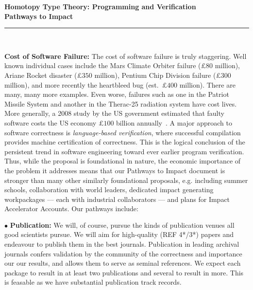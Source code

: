 \documentclass[a4paper,11pt]{article}
\begin{document}
\thispagestyle{plain}

\begin{center}

  {\Large {\bf Homotopy Type Theory: Programming and Verification \\
\vspace{0.2in} 
Pathways to Impact}}\\[1ex]   



\vspace*{-0.1in}



  \rule{150mm}{.5mm}\\[2ex]

\end{center}



\noindent



\vspace*{-0.1in}

{\bf Cost of Software Failure:} The cost of software failure is truly
staggering. Well known individual cases include the Mars Climate
Orbiter failure ($\pounds 80$ million), Ariane Rocket disaster
($\pounds 350$ million), Pentium Chip Division failure ($\pounds 300$
million), and more recently the heartbleed bug (est.\ $\pounds 400$
million).  There are many, many more examples. Even worse, 
failures such as one in the Patriot Missile System and
another in the Therac-25 radiation system have cost lives. More
generally, a 2008 study by the US government estimated that faulty
software costs the US economy $\pounds 100$ billion
annually~\cite{cnet08}.  A
major approach to software correctness is {\em language-based
  verification}, where successful compilation provides machine
certification of correctness. This is the logical conclusion of the
persistent trend in software engineering toward ever earlier program
verification. Thus, while the proposal is foundational in nature, the
economic importance of the problem it addresses means that our
Pathways to Impact document is stronger than many other similarly
foundational proposals, e.g. including summer schools, collaboration
with world leaders, dedicated impact generating workpackages --- each
with industrial collaborators --- and plans for Impact Accelerator
Accounts. Our pathways include:

\vspace*{0.02in}

$\bullet$ {\bf Publication:} We will, of course, pursue the kinds of
publication venues all good scientists pursue. We will
aim for high-quality (REF 4*/3*) papers and endeavour to publish them in the best
journals. Publication in leading archival journals 
confers validation by the community of the correctness and importance
our our results, and allows them to serve as seminal references.
We expect each package to result in at least two
publications and several to result in more. This is feasable as we
have substantial publication track records.
\end{document}
